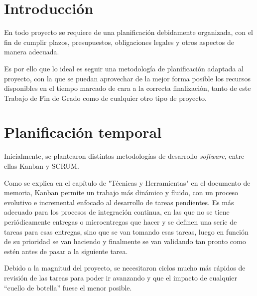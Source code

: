
\section{Introducción}

En todo proyecto se requiere de una planificación debidamente organizada, con el fin de cumplir plazos, presupuestos, obligaciones legales y otros aspectos de manera adecuada. 

Es por ello que lo ideal es seguir una metodología de planificación adaptada al proyecto, con la que se puedan aprovechar de la mejor forma posible los recursos disponibles en el tiempo marcado de cara a la correcta finalización, tanto de este Trabajo de Fin de Grado como de cualquier otro tipo de proyecto.

\section{Planificación temporal}

Inicialmente, se plantearon distintas metodologías de desarrollo \textit{software}, entre ellas Kanban y SCRUM.

Como se explica en el capítulo de "Técnicas y Herramientas" en el documento de memoria, Kanban permite un trabajo más dinámico y fluido, con un proceso evolutivo e incremental enfocado al desarrollo de tareas pendientes. Es más adecuado para los procesos de integración continua, en las que no se tiene periódicamente entregas o microentregas que hacer y se definen una serie de tareas para esas entregas, sino que se van tomando esas tareas, luego en función de su prioridad se van haciendo y finalmente se van validando tan pronto como estén antes de pasar a la siguiente tarea.

Debido a la magnitud del proyecto, se necesitaron ciclos mucho más rápidos de revisión de las tareas para poder ir avanzando y que el impacto de cualquier ``cuello de botella'' fuese el menor posible.

